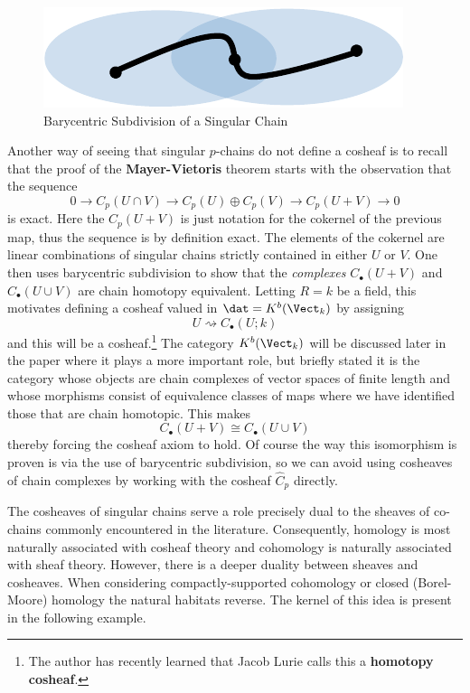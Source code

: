 \begin{figure}[ht]
\centering
\includegraphics[width=.4\textwidth]{sing.pdf}
\caption{Barycentric Subdivision of a Singular Chain}
\label{fig:sing}
\end{figure}

\begin{rmk}
	Another way of seeing that singular $p$-chains do not define a cosheaf is to recall that the proof of the \textbf{Mayer-Vietoris} theorem starts with the observation that the sequence
	\[
	0 \to C_p(U\cap V) \to C_p(U)\oplus C_p(V) \to C_p(U + V) \to 0
	\]
	is exact. Here the $C_p(U+V)$ is just notation for the cokernel of the previous map, thus the sequence is by definition exact. The elements of the cokernel  are linear combinations of singular chains strictly contained in either $U$ or $V$. One then uses barycentric subdivision to show that the \emph{complexes} $C_{\bullet}(U+V)$ and $C_{\bullet}(U \cup V)$ are chain homotopy equivalent. Letting $R=k$ be a field, this motivates defining a cosheaf valued in $\dat=K^b(\Vect_k)$ by assigning
	\[
	U \rightsquigarrow C_{\bullet}(U; k)
	\]
	and this will be a cosheaf.\footnote{The author has recently learned that Jacob Lurie calls this a \textbf{homotopy cosheaf}.} The category $K^b(\Vect_k)$ will be discussed later in the paper where it plays a more important role, but briefly stated it is the category whose objects are chain complexes of vector spaces of finite length and whose morphisms consist of equivalence classes of maps where we have identified those that are chain homotopic. This makes
	\[
		C_{\bullet}(U + V)\cong C_{\bullet}(U\cup V)
	\]
	thereby forcing the cosheaf axiom to hold. Of course the way this isomorphism is proven is via the use of barycentric subdivision, so we can avoid using cosheaves of chain complexes by working with the cosheaf $\hat{C}_p$ directly.
\end{rmk}

The cosheaves of singular chains serve a role precisely dual to the sheaves of co-chains commonly encountered in the literature. Consequently, homology is most naturally associated with cosheaf theory and cohomology is naturally associated with sheaf theory. However, there is a deeper duality between sheaves and cosheaves. When considering compactly-supported cohomology or closed (Borel-Moore) homology the natural habitats reverse. The kernel of this idea is present in the following example.


